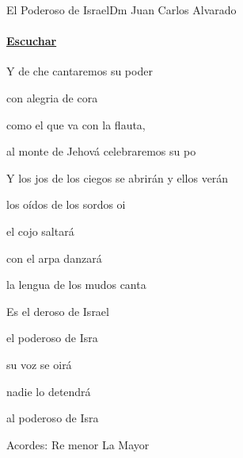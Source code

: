 \documentclass[12pt, spanish]{book}
\begin{document}
    \begin{song}{El Poderoso de Israel}{Dm}
    {} %
    {Juan Carlos Alvarado}
    {} %
    {}
        \ifChordBk
        \paragraph{\mbox{}\hfill\protect\href{https://open.spotify.com/intl-es/track/45P2LAIOap6HSduukxfiVc}{Escuchar}\mbox{}\hfill}
        \fi



        \begin{SBOpGroup}
            Y de che cantaremos su poder

            con alegria de cora

            como el que va con la flauta,

            al monte de Jehová celebraremos su po
        \end{SBOpGroup}

        \begin{SBOpGroup}
            Y los jos de los ciegos se abrirán y ellos verán

            los oídos de los sordos oi

            el cojo saltará

            con el arpa danzará

            la lengua de los mudos canta
        \end{SBOpGroup}

        \begin{SBChorus}
            Es el deroso de Israel

            el poderoso de Isra

            su voz se oirá

            nadie lo detendrá

            al poderoso de Isra
        \end{SBChorus}

        \ifChordBk
        \begin{SBOpGroup}
            Acordes:
            \upchord{\Dm}Re menor \hfill
            \upchord{\A}\qquad La Mayor \hfill\null\break
        \end{SBOpGroup}
        \fi


\end{song}
\end{document}
